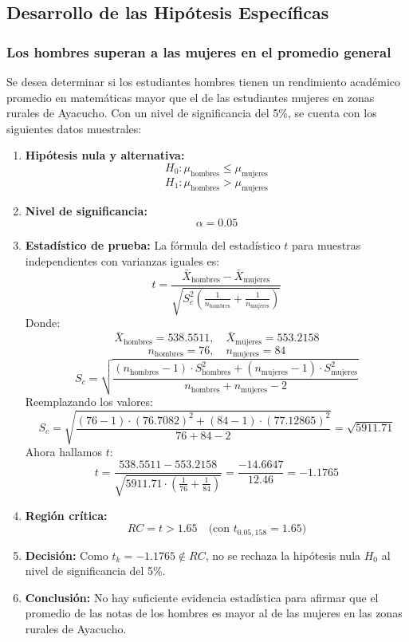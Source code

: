 \documentclass[
]{article}
\begin{document}
\subsection*{Desarrollo de las Hipótesis
Específicas}\label{desarrollo-de-las-hipuxf3tesis-especuxedficas}

\subsubsection*{Los hombres superan a las mujeres en el promedio
general}\label{los-hombres-superan-a-las-mujeres-en-el-promedio-general}

Se desea determinar si los estudiantes hombres tienen un rendimiento
académico promedio en matemáticas mayor que el de las estudiantes
mujeres en zonas rurales de Ayacucho. Con un nivel de significancia del
5\%, se cuenta con los siguientes datos muestrales:

\begin{enumerate}
  \item \textbf{Hipótesis nula y alternativa:}
    \[
    H_0: \mu_{\text{hombres}} \leq \mu_{\text{mujeres}}
    \]
    \[
    H_1: \mu_{\text{hombres}} > \mu_{\text{mujeres}}
    \]

  \item \textbf{Nivel de significancia:}
    \[
    \alpha = 0.05
    \]

  \item \textbf{Estadístico de prueba:}
    La fórmula del estadístico \(t\) para muestras independientes con varianzas iguales es:
    \[
    t = \frac{\bar{X}_{\text{hombres}} - \bar{X}_{\text{mujeres}}}{\sqrt{S_c^2 \left( \frac{1}{n_{\text{hombres}}} + \frac{1}{n_{\text{mujeres}}} \right)}}
    \]
    Donde:
    \[
    \bar{X}_{\text{hombres}} = 538.5511, \quad \bar{X}_{\text{mujeres}} = 553.2158
    \]
    \[
    n_{\text{hombres}} = 76, \quad n_{\text{mujeres}} = 84
    \]
    \[
    S_c = \sqrt{\frac{(n_{\text{hombres}} - 1) \cdot S_{\text{hombres}}^2 + (n_{\text{mujeres}} - 1) \cdot S_{\text{mujeres}}^2}{n_{\text{hombres}} + n_{\text{mujeres}} - 2}}
    \]
    Reemplazando los valores:
    \[
    S_c = \sqrt{\frac{(76 - 1) \cdot (76.7082)^2 + (84 - 1) \cdot (77.12865)^2}{76 + 84 - 2}} = \sqrt{5911.71}
    \]
    Ahora hallamos \(t\):
    \[
    t = \frac{538.5511 - 553.2158}{\sqrt{5911.71 \cdot \left( \frac{1}{76} + \frac{1}{84} \right)}} = \frac{-14.6647}{12.46} = -1.1765
    \]
  \item \textbf{Región crítica:}
    \[
    RC = t > 1.65 \quad \text{(con } t_{0.05, 158} = 1.65\text{)}
    \]

  \item \textbf{Decisión:}
    Como \(t_k = -1.1765 \notin RC\), no se rechaza la hipótesis nula \(H_0\) al nivel de significancia del 5\%.

  \item \textbf{Conclusión:}
    No hay suficiente evidencia estadística para afirmar que el promedio de las notas de los hombres es mayor al de las mujeres en las zonas rurales de Ayacucho.
\end{enumerate}
\end{document}
